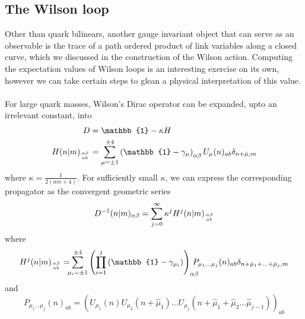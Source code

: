 \documentclass[a4paper,10pt]{book}
\begin{document}
\subsection{The Wilson loop}
Other than quark bilinears, another gauge invariant object that can serve as an observable is the trace of a path ordered product of link variables along a closed curve, which we discussed in the construction of the Wilson action. Computing the expectation values of Wilson loops is an interesting exercise on its own, however we can take certain steps to glean a physical interpretation of this value.\\\\For large quark masses, Wilson's Dirac operator can be expanded, upto an irrelevant constant, into 
\begin{equation}
\begin{aligned} 
D&=\mathbb{1}-\kappa H\\H(n\mkern-5mu \mid\mkern-5mu  m)_{\alpha \beta \atop a b}&=\sum_{\mu=\pm 1}^{\pm 4}\left(\mathbb{1}-\gamma_{\mu}\right)_{\alpha \beta} U_{\mu}(n)_{a b} \delta_{n+\hat{\mu}, m}
\end{aligned}
\end{equation}
where $\kappa=\frac{1}{2(a m+4)}$. For sufficiently small $\kappa$, we can express the corresponding propagator as the convergent geometric series
\begin{equation}
D^{-1}(n\mkern-5mu  \mid\mkern-5mu  m)_{\alpha \beta}=\sum_{j=0}^{\infty} \kappa^{j} H^j(n\mkern-5mu \mid\mkern-5mu  m)_{\alpha \beta \atop a b}
\end{equation}
where
\begin{equation}\label{eq:hopping_term}
H^{j}(n\mkern-5mu \mid\mkern-5mu m)_{\alpha \beta \atop a b}=\mkern-10mu\sum_{\mu_{i}=\pm 1}^{\pm 4}\left(\prod_{i=1}^{j}\left(\mathbb{1}-\gamma_{\mu_{i}}\right)\right)_{\alpha \beta}\mkern-16mu P_{\mu_{1} \ldots \mu_{j}}(n)_{a b} \delta_{n+\hat{\mu}_{1}+\ldots+\hat{\mu}_{j}, m}
\end{equation}
and
\begin{equation}
P_{\mu_{1} \ldots \mu_{j}}(n)_{a b}=\left(U_{\mu_{1}}(n) U_{\mu_{2}}\left(n+\hat{\mu}_{1}\right) \ldots U_{\mu_{j}}\left(n+\hat{\mu}_{1}+\hat{\mu}_{2} \ldots \hat{\mu}_{j-1}\right)\right)_{a b}
\end{equation}
\end{document}
